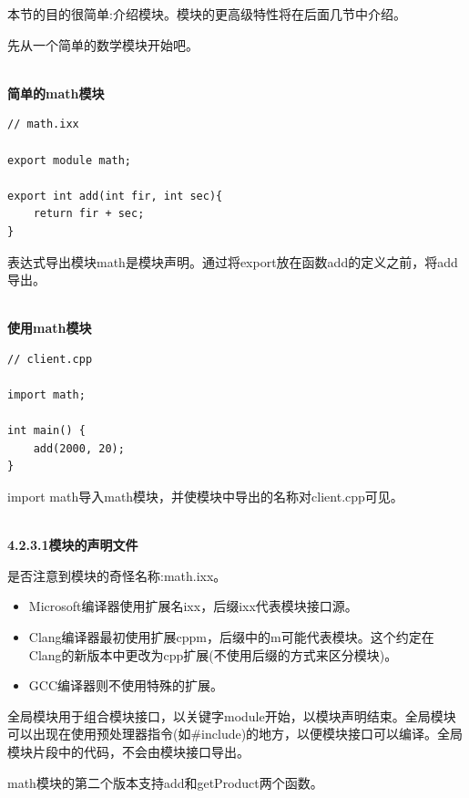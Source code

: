 
本节的目的很简单:介绍模块。模块的更高级特性将在后面几节中介绍。

先从一个简单的数学模块开始吧。

\hspace*{\fill} \\ %
\noindent
\textbf{简单的math模块}
\begin{lstlisting}[style=styleCXX]
// math.ixx

export module math;

export int add(int fir, int sec){
	return fir + sec;
}
\end{lstlisting}

表达式导出模块math是模块声明。通过将export放在函数add的定义之前，将add导出。

\hspace*{\fill} \\ %
\noindent
\textbf{使用math模块}
\begin{lstlisting}[style=styleCXX]
// client.cpp

import math;

int main() {
	add(2000, 20);
}
\end{lstlisting}

import math导入math模块，并使模块中导出的名称对client.cpp可见。

\hspace*{\fill} \\ %
\noindent
\textbf{4.2.3.1\hspace{0.2cm}模块的声明文件}

是否注意到模块的奇怪名称:math.ixx。

\begin{itemize}
\item 
Microsoft编译器使用扩展名ixx，后缀ixx代表模块接口源。

\item 
Clang编译器最初使用扩展cppm，后缀中的m可能代表模块。这个约定在Clang的新版本中更改为cpp扩展(不使用后缀的方式来区分模块)。

\item 
GCC编译器则不使用特殊的扩展。
\end{itemize}

全局模块用于组合模块接口，以关键字module开始，以模块声明结束。全局模块可以出现在使用预处理器指令(如\#include)的地方，以便模块接口可以编译。全局模块片段中的代码，不会由模块接口导出。

math模块的第二个版本支持add和getProduct两个函数。

